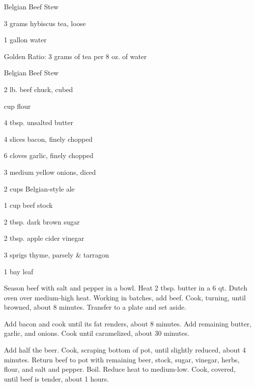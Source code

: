 \documentclass{cookbook}
\begin{document}
\begin{recipe}{Belgian Beef Stew}

\begin{ingredients}
    \item 3 grams hybiscus tea, loose
    \item 1 gallon water
\end{ingredients}

Golden Ratio: 3 grams of tea per 8 oz. of water

\end{recipe}

\begin{recipe}{Belgian Beef Stew}

\begin{ingredients}
    \item 2 lb. beef chuck, cubed
    \item {} cup flour
    \item 4 tbsp. unsalted butter
    \item 4 slices bacon, finely chopped
    \item 6 cloves garlic, finely chopped
    \item 3 medium yellow onions, diced
    \item 2 cups Belgian-style ale
    \item 1 cup beef stock
    \item 2 tbsp. dark brown sugar
    \item 2 tbsp. apple cider vinegar
    \item 3 sprigs thyme, parsely \& tarragon
    \item 1 bay leaf
\end{ingredients}

Season beef with salt and pepper in a bowl. Heat 2 tbsp. butter in a 6 qt. Dutch oven over medium-high heat. Working in batches, add beef. Cook, turning, until browned, about 8 minutes. Transfer to a plate and set aside.

Add bacon and cook until its fat renders, about 8 minutes. Add remaining butter, garlic, and onions. Cook until caramelized, about 30 minutes.

Add half the beer. Cook, scraping bottom of pot, until slightly reduced, about 4 minutes. Return beef to pot with remaining beer, stock, sugar, vinegar, herbs, flour, and salt and pepper. Boil. Reduce heat to medium-low. Cook, covered, until beef is tender, about 1  hours.

\end{recipe}
\end{document}
